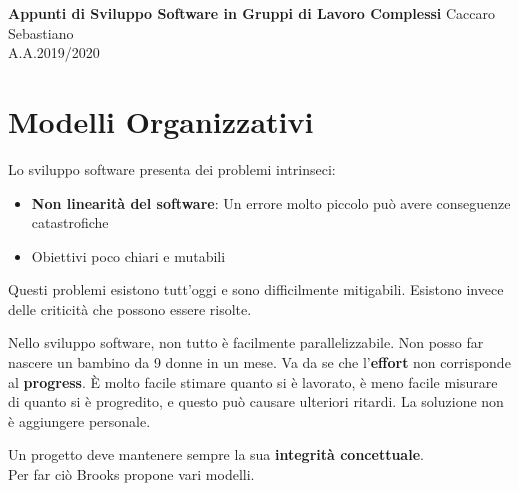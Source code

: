 \documentclass[a4paper,12pt]{article}
\begin{document}
\begin{titlepage}
\begin{center}
	\Large{\textbf{Appunti di Sviluppo Software in Gruppi di Lavoro Complessi}}
\vfill
\normalsize{Caccaro Sebastiano}\\
\normalsize{A.A.2019/2020}
\end{center}
\end{titlepage}
\tableofcontents

\clearpage


\section{Modelli Organizzativi}
Lo sviluppo software presenta dei problemi intrinseci:
\begin{itemize}
\item \textbf{Non linearità del software}: Un errore molto piccolo può avere conseguenze catastrofiche
\item Obiettivi poco chiari e mutabili
\end{itemize}
Questi problemi esistono tutt'oggi e sono difficilmente mitigabili. Esistono invece delle criticità che possono essere risolte.


Nello sviluppo software, non tutto è facilmente parallelizzabile. Non posso far nascere un bambino da 9 donne in un mese. Va da se che l'\textbf{effort} non corrisponde al \textbf{progress}. \`E molto facile stimare quanto si è lavorato, è meno facile misurare di quanto si è progredito, e questo può causare ulteriori ritardi. La soluzione non è aggiungere personale.

Un progetto deve mantenere sempre la sua \textbf{integrità concettuale}.\\
Per far ciò Brooks propone vari modelli.
\end{document}
